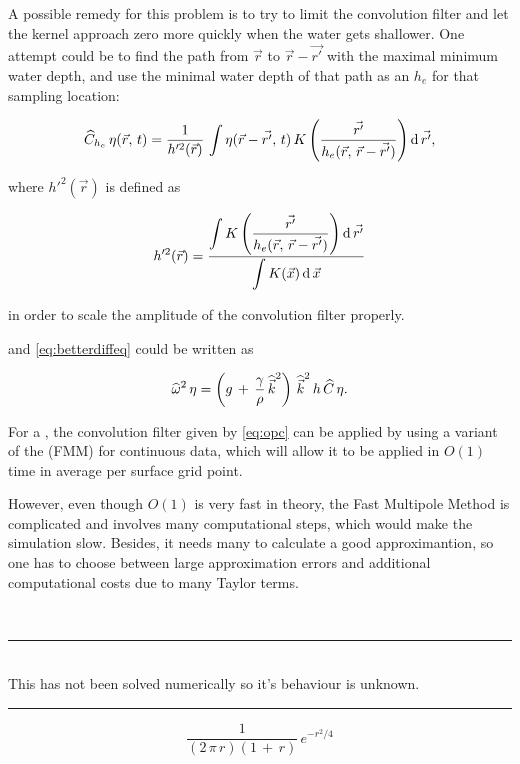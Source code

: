A possible remedy for this problem is to try to limit the convolution filter and let the kernel approach zero more quickly when the water gets shallower. One attempt could be to find the path from $\vec{r}$ to $\vec{r}-\vec{r'}$ with the maximal minimum water depth, and use the minimal water depth of that path as an  $h_e$ for that sampling location:

\begin{equation} \label{eq:opcmoresophisticated}
\widehat{C}_{h_e}\,\eta(\vec{r},\,t) = \frac{1}{h'^2(\vec{r})}\,\int\eta(\vec{r}-\vec{r'},\,t)\,K\left(\frac{\vec{r'}}{h_e(\vec{r},\,\vec{r}-\vec{r'})}\right) \operatorname{d}\vec{r'},
\end{equation}

where $h'^2(\vec{r})$ is defined as 

\begin{equation} \label{eq:hsqreffective}
h'^2(\vec{r}) = \frac{\displaystyle\int K\left(\frac{\vec{r'}}{h_e(\vec{r},\,\vec{r}-\vec{r'})}\right) \operatorname{d}\vec{r'}}{\displaystyle\int K(\vec{x}) \operatorname{d}\vec{x}}
\end{equation}

in order to scale the amplitude of the convolution filter properly.


and \eqref{eq:betterdiffeq} could be written as

\begin{equation} \label{eq:bestdiffeq}
\widehat{\omega}^2\,\eta = \left(g\,+\,\frac{\gamma}{\rho}\,{\widehat{\vec{k}}}^2\right)\,{\widehat{\vec{k}}}^2\,h\,\widehat{C}\,\eta.
\end{equation}

For a , the convolution filter given by \eqref{eq:opc} can be applied by using a variant of the  (FMM) \citep{Greengard1987} for continuous data, which will allow it to be applied in $O(1)$ time in average per surface grid point.

However, even though $O(1)$ is very fast in theory, the Fast Multipole Method is complicated and involves many computational steps, which would make the simulation slow. Besides, it needs many  to calculate a good approximantion, so one has to choose between large approximation errors and additional computational costs due to many Taylor terms.


\ \\
\hrule{}
\ \\
This  has not been solved numerically so it's behaviour is unknown.
\ \\
\hrule{}

\begin{equation}
\frac{1}{(2\,\pi\,r)(1\,+\,r)}\,e^{-r^2/4}
\end{equation}

